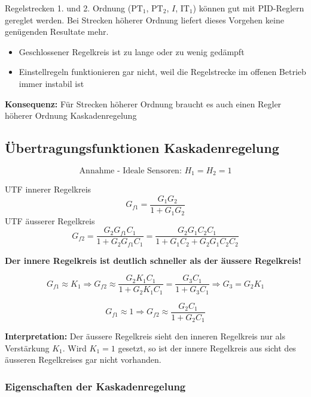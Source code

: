 Regelstrecken 1. und 2. Ordnung ($\text{PT}_1$, $\text{PT}_2$, $I$, $\text{IT}_1$) können gut mit PID-Reglern gereglet werden. 
Bei Strecken höherer Ordnung liefert dieses Vorgehen keine genügenden Resultate mehr.

\begin{itemize}
    \item Geschlossener Regelkreis ist zu lange oder zu wenig gedämpft
    \item Einstellregeln funktionieren gar nicht, weil die Regelstrecke im offenen Betrieb immer instabil ist
\end{itemize}

\textbf{Konsequenz:} Für Strecken höherer Ordnung braucht es auch einen Regler höherer Ordnung \textrightarrow Kaskadenregelung


\subsection{Übertragungsfunktionen Kaskadenregelung}

\begin{minipage}[c]{0.56\columnwidth}
    
    $$ \text{Annahme - Ideale Sensoren: } H_1 = H_2 = 1$$
    
\end{minipage}
\hfill
\begin{minipage}[c]{0.43\columnwidth}
    UTF innerer Regelkreis
    $$ G_{f1} = \frac{G_1 G_2}{1 + G_1 G_2} $$
    UTF äusserer Regelkreis
    $$ \textstyle{ G_{f2} = \frac{G_2 G_{f1} C_1}{1 + G_2 G_{f1} C_1} = \frac{G_2 G_1 C_2 C_1}{1 + G_1 C_2 + G_2 G_1 C_2 C_2}} $$
\end{minipage}

\vspace{0.2cm}
\textbf{Der innere Regelkreis ist deutlich schneller als der äussere Regelkreis!}

$$ G_{f1} \approx K_1 \Rightarrow G_{f2} \approx \frac{G_2 K_1 C_1}{1 + G_2 K_1 C_1} = \frac{G_3 C_1}{1 + G_3 C_1} \Rightarrow G_3 = G_2 K_1 $$

$$ G_{f1} \approx 1  \Rightarrow G_{f2} \approx \frac{G_2 C_1}{1 + G_2 C_1}  $$

\textbf{Interpretation:} Der äussere Regelkreis sieht den inneren Regelkreis nur als Verstärkung $K_1$. Wird $K_1 = 1$ gesetzt, so
ist der innere Regelkreis aus sicht des äusseren Regelkreises gar nicht vorhanden.


\subsubsection{Eigenschaften der Kaskadenregelung}

